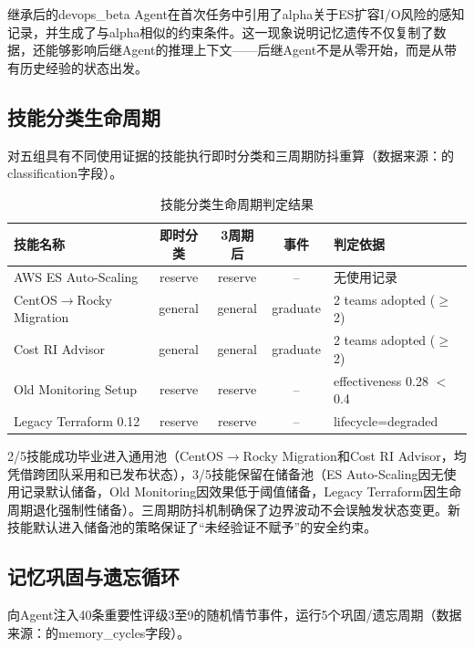 \documentclass[12pt,a4paper]{ctexart}
\begin{document}
继承后的devops\_beta Agent在首次任务中引用了alpha关于ES扩容I/O风险的感知记录，并生成了与alpha相似的约束条件。这一现象说明记忆遗传不仅复制了数据，还能够影响后继Agent的推理上下文——后继Agent不是从零开始，而是从带有历史经验的状态出发。

\subsection{技能分类生命周期}

对五组具有不同使用证据的技能执行即时分类和三周期防抖重算（数据来源：的classification字段）。

\begin{table}[H]
\centering
\caption{技能分类生命周期判定结果}
\label{tab:classify}
\begin{tabular}{lcccl}
\toprule
技能名称 & 即时分类 & 3周期后 & 事件 & 判定依据 \\
\midrule
AWS ES Auto-Scaling  & reserve  & reserve  & --        & 无使用记录 \\
CentOS$\to$Rocky Migration & general  & general  & graduate  & 2 teams adopted ($\geq$2) \\
Cost RI Advisor       & general  & general  & graduate  & 2 teams adopted ($\geq$2) \\
Old Monitoring Setup  & reserve  & reserve  & --        & effectiveness 0.28 $<$ 0.4 \\
Legacy Terraform 0.12 & reserve  & reserve  & --        & lifecycle=degraded \\
\bottomrule
\end{tabular}
\end{table}

2/5技能成功毕业进入通用池（CentOS$\to$Rocky Migration和Cost RI Advisor，均凭借跨团队采用和已发布状态），3/5技能保留在储备池（ES Auto-Scaling因无使用记录默认储备，Old Monitoring因效果低于阈值储备，Legacy Terraform因生命周期退化强制性储备）。三周期防抖机制确保了边界波动不会误触发状态变更。新技能默认进入储备池的策略保证了“未经验证不赋予”的安全约束。

\subsection{记忆巩固与遗忘循环}

向Agent注入40条重要性评级3至9的随机情节事件，运行5个巩固/遗忘周期（数据来源：的memory\_cycles字段）。
\end{document}
